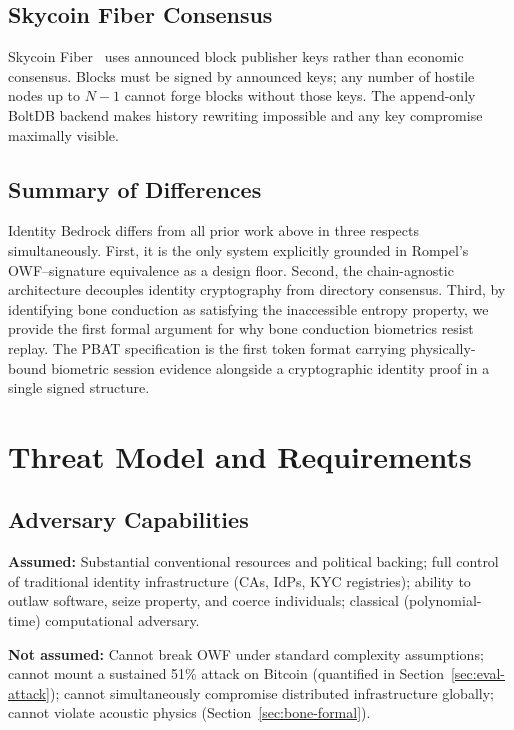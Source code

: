\documentclass[12pt,a4paper]{article}
\begin{document}
\subsection{Skycoin Fiber Consensus}

Skycoin Fiber~\cite{Skycoin} uses announced block publisher keys rather
than economic consensus. Blocks must be signed by announced keys; any
number of hostile nodes up to $N-1$ cannot forge blocks without those
keys. The append-only BoltDB backend makes history rewriting impossible
and any key compromise maximally visible.

\subsection{Summary of Differences}

Identity Bedrock differs from all prior work above in three respects
simultaneously. First, it is the only system explicitly grounded in
Rompel's OWF--signature equivalence as a design floor. Second, the
chain-agnostic architecture decouples identity cryptography from
directory consensus. Third, by identifying bone conduction as satisfying
the inaccessible entropy property, we provide the first formal argument
for why bone conduction biometrics resist replay. The PBAT specification
is the first token format carrying physically-bound biometric session
evidence alongside a cryptographic identity proof in a single signed
structure.

\section{Threat Model and Requirements}
\label{sec:threat}

\subsection{Adversary Capabilities}

\textbf{Assumed:} Substantial conventional resources and political
backing; full control of traditional identity infrastructure (CAs, IdPs,
KYC registries); ability to outlaw software, seize property, and coerce
individuals; classical (polynomial-time) computational adversary.

\textbf{Not assumed:} Cannot break OWF under standard complexity
assumptions; cannot mount a sustained 51\% attack on Bitcoin (quantified
in Section~\ref{sec:eval-attack}); cannot simultaneously compromise
distributed infrastructure globally; cannot violate acoustic physics
(Section~\ref{sec:bone-formal}).
\end{document}
